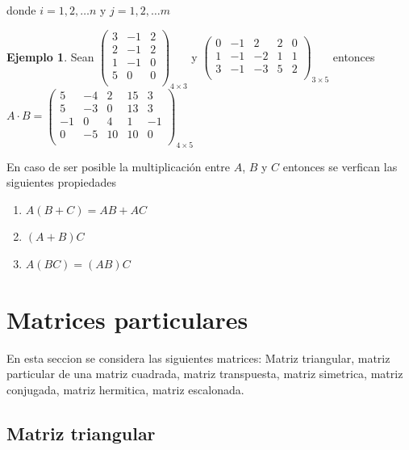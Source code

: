 \documentclass[
  11pt,
]{krantz}
\providecommand{\tightlist}{%
  \setlength{\itemsep}{0pt}\setlength{\parskip}{0pt}}
\theoremstyle{definition}
\theoremstyle{definition}
\newtheorem{example}{Ejemplo}[chapter]
\theoremstyle{definition}
\theoremstyle{definition}
\theoremstyle{remark}
\begin{document}
donde \(i=1,2,\ldots n\) y \(j=1,2,\ldots m\)

\begin{example}
Sean \(\begin{pmatrix} 3&-1&2\\ 2&-1&2\\ 1&-1&0\\ 5&0&0\\ \end{pmatrix}_{4\times 3}\) y \(\begin{pmatrix} 0&-1&2&2&0\\ 1&-1&-2&1&1\\ 3&-1&-3&5&2\\ \end{pmatrix}_{3\times 5}\) entonces \(A\cdot B=\begin{pmatrix} 5&-4&2&15&3\\ 5&-3&0&13&3\\ -1&0&4&1&-1\\ 0&-5&10&10&0\\ \end{pmatrix}_{4\times 5}\)
\end{example}

En caso de ser posible la multiplicación entre \(A\), \(B\) y \(C\) entonces se verfican las siguientes propiedades

\begin{enumerate}
\def\labelenumi{\arabic{enumi}.}
\tightlist
\item
  \(A(B+C)=AB+AC\)
\item
  \((A+B)C\)
\item
  \(A(BC)=(AB)C\)
\end{enumerate}

\hypertarget{matrices-particulares}{%
\section{Matrices particulares}\label{matrices-particulares}}

En esta seccion se considera las siguientes matrices: Matriz triangular, matriz particular de una matriz cuadrada,
matriz transpuesta,
matriz simetrica,
matriz conjugada,
matriz hermitica,
matriz escalonada.

\hypertarget{matriz-triangular}{%
\subsection{Matriz triangular}\label{matriz-triangular}}
\end{document}
